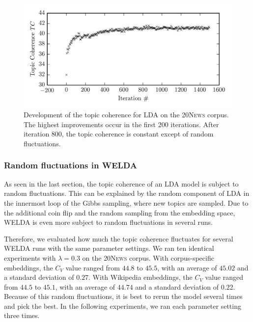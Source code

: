 \documentclass[
        a4paper,
        titlepage,
        twoside,
        parskip
        ]{scrbook}
\theoremstyle{break}
\begin{document}
\begin{figure}
       \centering
       \includegraphics[width=12cm]{figures/lda_20news_tc_development.png}
       \caption{Development of the topic coherence for LDA on the \textsc{20News} corpus. The highest improvements occur in the first 200 iterations. After iteration 800, the topic coherence is constant except of random fluctuations.}
       \label{fig:lda_20news_tc_development}
\end{figure}

\subsubsection{Random fluctuations in WELDA}

As seen in the last section, the topic coherence of an LDA model is subject to random fluctuations.
This can be explained by the random component of LDA in the innermost loop of the Gibbs sampling, where new topics are sampled.
Due to the additional coin flip and the random sampling from the embedding space, WELDA is even more subject to random fluctuations in several runs.

Therefore, we evaluated how much the topic coherence fluctuates for several WELDA runs with the same parameter settings.
We ran ten identical experiments with $\lambda = 0.3$ on the \textsc{20News} corpus.
With corpus-specific embeddings, the $C_V$ value ranged from $44.8$ to $45.5$, with an average of $45.02$ and a standard deviation of $0.27$.
With Wikipedia embeddings, the $C_V$ value ranged from $44.5$ to $45.1$, with an average of $44.74$ and a standard deviation of $0.22$.
Because of this random fluctuations, it is best to rerun the model several times and pick the best.
In the following experiments, we ran each parameter setting three times.
\end{document}
